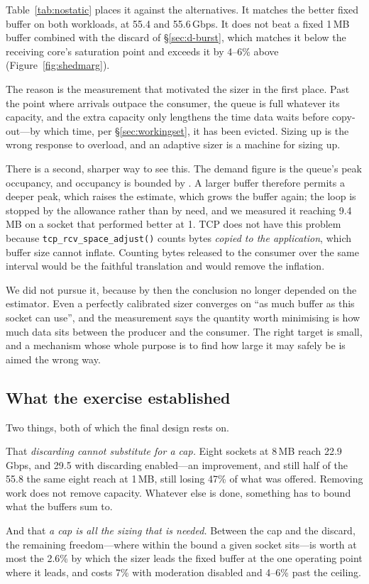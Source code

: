 Table~\ref{tab:nostatic} places it against the alternatives. It matches the
better fixed buffer on both workloads, at 55.4 and 55.6\,Gbps. It does not beat a fixed 1\,MB buffer
combined with the discard of \S\ref{sec:d-burst}, which matches it below the
receiving core's saturation point and exceeds it by 4--6\% above
(Figure~\ref{fig:shedmarg}).

The reason is the measurement that motivated the sizer in the first place. Past
the point where arrivals outpace the consumer, the queue is full whatever its
capacity, and the extra capacity only lengthens the time data waits before
copy-out---by which time, per \S\ref{sec:workingset}, it has been evicted.
Sizing up is the wrong response to overload, and an adaptive sizer is a machine
for sizing up.

There is a second, sharper way to see this. The demand figure is the queue's
peak occupancy, and occupancy is bounded by \rcvbuf. A larger buffer therefore
permits a deeper peak, which raises the estimate, which grows the buffer again;
the loop is stopped by the allowance rather than by need, and we measured it
reaching 9.4\,MB on a socket that performed better at 1. TCP does not have this
problem because \texttt{tcp\_rcv\_space\_adjust()} counts bytes \emph{copied to
the application}, which buffer size cannot inflate. Counting bytes released to
the consumer over the same interval would be the faithful translation and would
remove the inflation.

We did not pursue it, because by then the conclusion no longer depended on the
estimator. Even a perfectly calibrated sizer converges on ``as much buffer as
this socket can use'', and the measurement says the quantity worth minimising
is how much data sits between the producer and the consumer. The right target is
small, and a mechanism whose whole purpose is to find how large it may safely be
is aimed the wrong way.

\subsection{What the exercise established}

Two things, both of which the final design rests on.

That \emph{discarding cannot substitute for a cap.} Eight sockets at 8\,MB reach
22.9\,Gbps, and 29.5 with discarding enabled---an improvement, and still half of
the 55.8 the same eight reach at 1\,MB, still losing 47\% of what was offered.
Removing work does not remove capacity. Whatever else is done, something has to
bound what the buffers sum to.

And that \emph{a cap is all the sizing that is needed.} Between the cap and the
discard, the remaining freedom---where within the bound a given socket sits---is
worth at most the 2.6\% by which the sizer leads the fixed buffer at the one
operating point where it leads, and costs 7\% with moderation disabled and
4--6\% past the ceiling.
